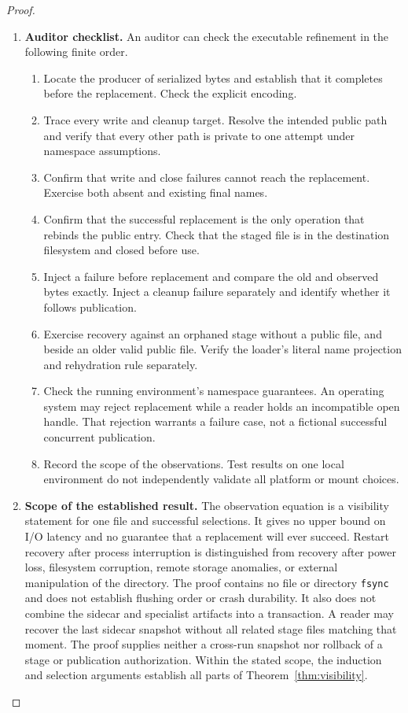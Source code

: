 \documentclass[12pt]{article}
\begin{document}
\begin{proof}
\begin{enumerate}
\item \textbf{Auditor checklist.}
An auditor can check the executable refinement in the
following finite order.
\begin{enumerate}
\item Locate the producer of serialized bytes and establish that
it completes before the replacement. Check the explicit encoding.
\item Trace every write and cleanup target. Resolve the intended
public path and verify that every other path is private to
one attempt under namespace assumptions.
\item Confirm that write and close failures cannot reach the
replacement. Exercise both absent and existing final names.
\item Confirm that the successful replacement is the only
operation that rebinds the public entry. Check that the staged
file is in the destination filesystem and closed before use.
\item Inject a failure before replacement and compare the old
and observed bytes exactly. Inject a cleanup failure separately
and identify whether it follows publication.
\item Exercise recovery against an orphaned stage without a
public file, and beside an older valid public file. Verify the
loader's literal name projection and rehydration rule separately.
\item Check the running environment's namespace guarantees.
An operating system may reject replacement while a reader holds
an incompatible open handle. That rejection warrants a failure
case, not a fictional successful concurrent publication.
\item Record the scope of the observations. Test results on one
local environment do not independently validate all platform
or mount choices.
\end{enumerate}

\item \textbf{Scope of the established result.}
The observation equation is a visibility statement for one
file and successful selections.
It gives no upper bound on I/O latency and no guarantee that
a replacement will ever succeed.
Restart recovery after process interruption is distinguished
from recovery after power loss, filesystem corruption, remote
storage anomalies, or external manipulation of the directory.
The proof contains no file or directory \texttt{fsync} and
does not establish flushing order or crash durability.
It also does not combine the sidecar and specialist artifacts
into a transaction. A reader may recover the last sidecar
snapshot without all related stage files matching that moment.
The proof supplies neither a cross-run snapshot nor rollback
of a stage or publication authorization.
Within the stated scope, the induction and selection arguments
establish all parts of Theorem~\ref{thm:visibility}.
\end{enumerate}
\end{proof}
\end{document}
